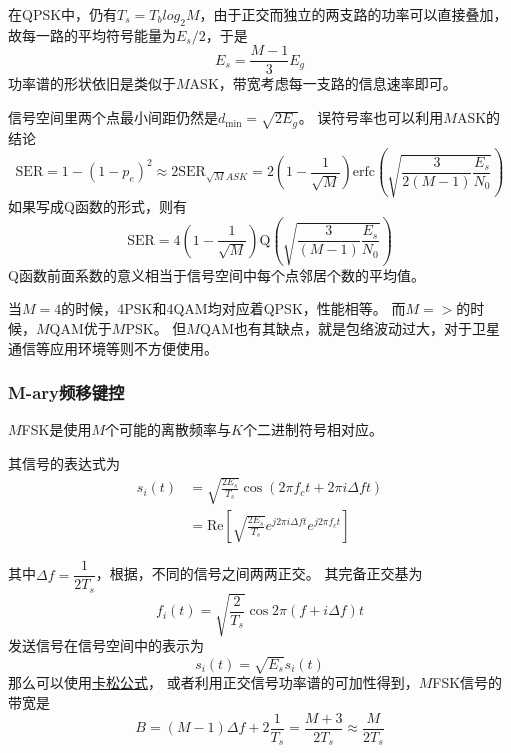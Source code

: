     在QPSK中，仍有$T_s=T_blog_2M$，由于正交而独立的两支路的功率可以直接叠加，
    故每一路的平均符号能量为$E_s/2$，于是
    \begin{equation}
        E_s =\frac{M-1}{3}E_g
    \end{equation}
    功率谱的形状依旧是类似于$M$ASK，带宽考虑每一支路的信息速率即可。

    信号空间里两个点最小间距仍然是$d_{\text{min}}=\sqrt{2E_g}$。
    误符号率也可以利用$M$ASK的结论
    \begin{equation}
        \mathrm{SER}=1-(1-p_e)^2\approx 2\text{SER}_\text{$\sqrt{M}ASK$}=2\left(1-\frac{1}{\sqrt{M}}\right)\text{erfc}\left(\sqrt{\frac{3}{2(M-1)}\frac{E_s}{N_0}}\right)
    \end{equation}
    如果写成Q函数的形式，则有
    \begin{equation}
        \mathrm{SER}=4\left(1-\frac{1}{\sqrt{M}}\right)\text{Q}\left(\sqrt{\frac{3}{(M-1)}\frac{E_s}{N_0}}\right) 
    \end{equation}
    Q函数前面系数的意义相当于信号空间中每个点邻居个数的平均值。
    
    当$M=4$的时候，4PSK和4QAM均对应着QPSK，性能相等。
    而$M=>$的时候，$M$QAM优于$M$PSK。
    但$M$QAM也有其缺点，就是包络波动过大，对于卫星通信等应用环境等则不方便使用。

    \subsubsection{M-ary频移键控}
    $M$FSK是使用$M$个可能的离散频率与$K$个二进制符号相对应。

    其信号的表达式为
    \begin{equation}
        \begin{split}
            s_i(t)  &=\sqrt{\frac{2E_s}{T_s}}\cos(2\pi f_ct+2\pi i\Delta ft)\\
                    &=\text{Re}\left[\sqrt{\frac{2E_s}{T_s}}e^{j2\pi i\Delta ft}e^{j2\pi f_ct}\right]
        \end{split}
    \end{equation}

    其中$\Delta f=\dfrac{1}{2T_s}$，根据，不同的信号之间两两正交。
    其完备正交基为
    \begin{equation}
        f_i(t)=\sqrt{\frac{2}{T_s}}\cos 2\pi(f+i\Delta f)t
    \end{equation}
    发送信号在信号空间中的表示为
    \begin{equation}
        s_i(t)=\sqrt{E_s}s_i(t)
    \end{equation}
    那么可以使用\hyperref[eq:Carson]{卡松公式}，
    或者利用正交信号功率谱的可加性得到，$M$FSK信号的带宽是
    \begin{equation}
        B=(M-1)\Delta f+2\frac{1}{T_s}=\frac{M+3}{2T_s}\approx\frac{M}{2T_s}
    \end{equation}

